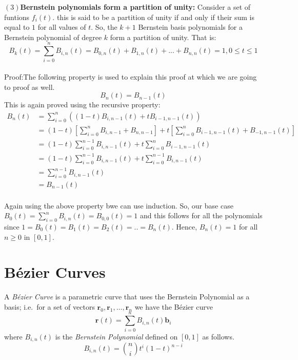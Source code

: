 \documentclass{article}
\begin{document}
\textbf{$(3)$Bernstein polynomials form a partition of unity:}
Consider a set of funtions $f_i(t)$. this is said to be a partition of unity if and only if their sum is equal to $1$ for all values of $t$. So, the $k + 1$ Bernstein basis polynomials for a Bernstein polynomial of degree $k$ form a partition of unity. That is:
\begin{equation}
B_k(t)=\sum_{i=0}^nB_{i,n}(t)= B_{0,n}(t)+B_{1,n}(t)+...+B_{n,n}(t)=1,  0\leq t\leq 1  
\end{equation}\paragraph{}
Proof:The following property is used to explain this proof at which we are going to proof as well.
\begin{equation}
B_n(t)=B_{n-1}(t)    
\end{equation}
This is again proved using the recursive property:
\begin{align*}
B_n(t)&=\sum_{i=0}^n((1-t)B_{i,n-1}(t)+tB_{i-1,n-1}(t))\\
&=(1-t)\left[\sum_{i=0}^nB_{i,n-1}+B_{n,n-1}\right]+t\left[\sum_{i=0}^nB_{i-1,n-1}(t)+B_{-1,n-1}(t)\right]\\
&=(1-t)\sum_{i=0}^{n-1}B_{i,n-1}(t)+t\sum_{i=0}^{n}B_{i-1,n-1}(t)\\
&=(1-t)\sum_{i=0}^{n-1}B_{i,n-1}(t)+t\sum_{i=0}^{n-1}B_{i,n-1}(t)\\
&=\sum_{i=0}^{n-1}B_{i,n-1}(t)\\
&=B_{n-1}(t)
\end{align*}\paragraph{}
Again using the above property bwe can use induction. So, our base case $B_0(t)=\sum_{i=0}^nB_{i,n}(t)=B_{0,0}(t)=1$ and this follows for all the polynomials since $1=B_0(t)=B_1(t)=B_2(t)=..=B_n(t)$. Hence, $B_n(t)=1$ for all $n\geq0$ in $[0,1]$.
\section{B\'ezier Curves}\label{sec:bec}
A \emph{B\'ezier Curve} is a parametric curve that uses the Bernstein Polynomial as a basis; %
i.e.\ for a set of vectors $\mathbf{r}_0, \mathbf{r}_1, \dots, \mathbf{r}_n$ we have the B\'ezier curve
\begin{equation} \label{eq:bec:1}
\mathbf{r}(t) = \sum_{i=0}^{n} B_{i,n}(t) \mathbf{b}_i
\end{equation}
where $B_{i,n}(t)$ is the \emph{Bernstein Polynomial} defined on $\left[0,1 \right]$ as follows.
\[
  B_{i,n}(t) = \binom{n}{i} t^i (1 - t)^{n-i}
\]
\end{document}
